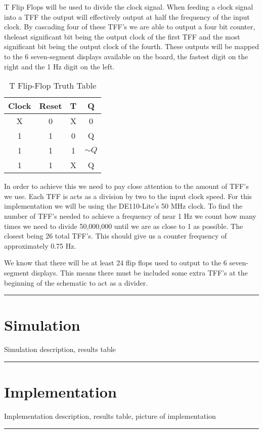 \documentclass{article}
\begin{document}
T Flip Flops will be used to divide the clock signal. When feeding a clock signal into a TFF the output will effectively output at half the frequency of the input clock. By cascading four of these TFF's we are able to output a four bit counter, theleast significant bit being the output clock of the first TFF and the most significant bit being the output clock of the fourth. These outputs will be mapped to the 6 seven-segment displays available on the board, the fastest digit on the right and the 1 Hz digit on the left.   

\begin{table}[H]
  \centering
  \begin{tabular}{|c|c|c||c|}
  \hline
  \textbf{Clock} & \textbf{Reset} & \textbf{T} & \textbf{Q} \\
  \hline
  X & 0 & X & 0 \\
  \hline
  1 & 1 & 0 & Q \\
  \hline
  1 & 1 & 1 & $\sim Q$ \\
  \hline
  1 & 1 & X & Q \\
  \hline
  \end{tabular}
  \caption{T Flip-Flop Truth Table}
\end{table}
  
In order to achieve this we need to pay close attention to the amount of TFF's we use. Each TFF is acts as a division by two to the input clock speed. For this implementation we will be using the DE110-Lite's 50 MHz clock. To find the number of TFF's needed to achieve a frequency of near 1 Hz we count how many times we need to divide 50,000,000 until we are as close to 1 as possible. The closest being 26 total TFF's. This should give us a counter frequency of approximately 0.75 Hz. 

We know that there will be at least 24 flip flops used to output to the 6 seven-segment displays. This means there must be included some extra TFF's at the beginning of the schematic to act as a divider. 
\vspace{5mm}
\hrule

\section*{\textcolor{mycolor}{Simulation}}
Simulation description, results table
\vspace{5mm}
\hrule

\section*{\textcolor{mycolor}{Implementation}}
Implementation description, results table, picture of implementation
\vspace{5mm}
\hrule
\end{document}
